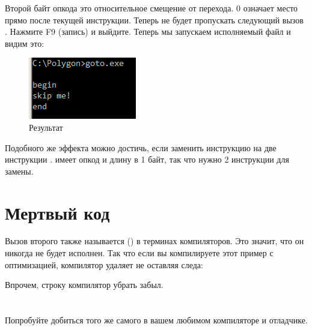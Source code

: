 Второй байт опкода \JMP это относительное смещение от перехода. 0 означает место
прямо после текущей инструкции.
Теперь \JMP не будет пропускать следующий вызов \printf.
Нажмите F9 (запись) и выйдите.
Теперь мы запускаем исполняемый файл и видим это:

\begin{figure}[H]
\centering
\includegraphics[scale=\NormalScale]{patterns/065_GOTO/result.png}
\caption{Результат}
\label{fig:goto_result}
\end{figure}

Подобного же эффекта можно достичь, если заменить инструкцию \JMP на две инструкции \NOP.
\NOP имеет опкод  и длину в 1 байт, так что нужно 2 инструкции для замены.

\fi

\section{Мертвый код}

Вызов второго \printf также называется  () 
в терминах компиляторов.
Это значит, что он никогда не будет исполнен.
Так что если вы компилируете этот пример с оптимизацией, компилятор удаляет  не оставляя следа:



Впрочем, строку  компилятор убрать забыл.


\ifdefined\IncludeExercises
\section{\Exercise}

Попробуйте добиться того же самого в вашем любимом компиляторе и отладчике.

\fi

